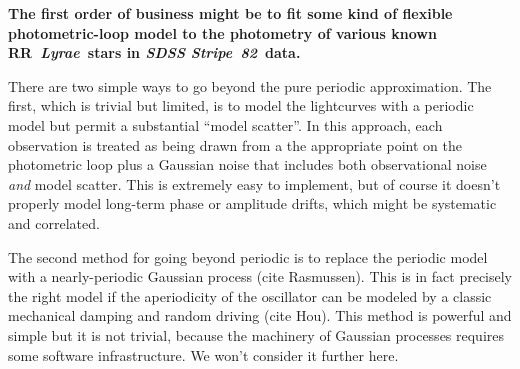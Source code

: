 \documentclass[12pt]{article}
\newcommand{\project}[1]{\textsl{#1}}
\newcommand{\stripe}{\project{SDSS Stripe~82}}
\newcommand{\rrl}{RR~\textit{Lyrae}}
\begin{document}
\textbf{The first order of business might be to fit some kind of flexible
photometric-loop model to the photometry of various known \rrl\ stars
in \stripe\ data.}

There are two simple ways to go beyond the pure periodic
approximation.  The first, which is trivial but limited, is to model
the lightcurves with a periodic model but permit a substantial ``model
scatter''.  In this approach, each observation is treated as being
drawn from a the appropriate point on the photometric loop plus a
Gaussian noise that includes both observational noise \emph{and} model
scatter.  This is extremely easy to implement, but of course it
doesn't properly model long-term phase or amplitude drifts, which
might be systematic and correlated.

The second method for going beyond periodic is to replace the periodic
model with a nearly-periodic Gaussian process (cite Rasmussen).  This
is in fact precisely the right model if the aperiodicity of the
oscillator can be modeled by a classic mechanical damping and random
driving (cite Hou).  This method is powerful and simple but it is not
trivial, because the machinery of Gaussian processes requires some
software infrastructure.  We won't consider it further here.
\end{document}
